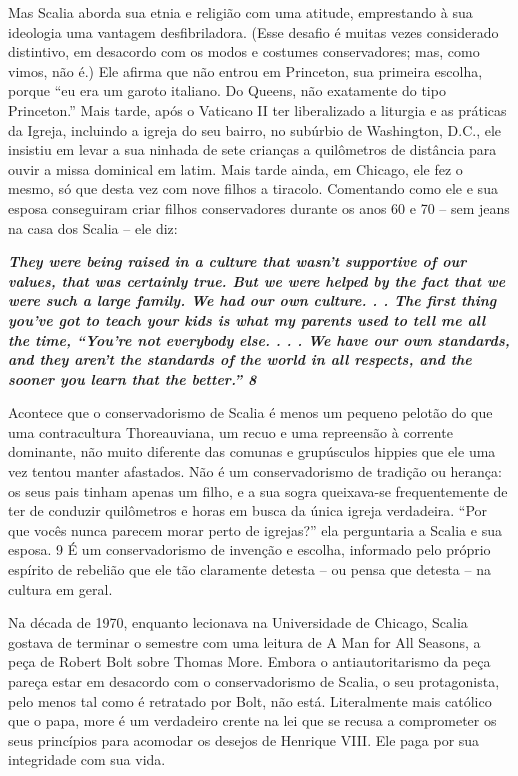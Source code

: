  
\par
 
Mas Scalia aborda sua etnia e religião com uma atitude, emprestando à sua ideologia uma vantagem desfibriladora. (Esse desafio é muitas vezes considerado distintivo, em desacordo com os modos e costumes conservadores; mas, como vimos, não é.) Ele afirma que não entrou em Princeton, sua primeira escolha, porque “eu era um garoto italiano. Do Queens, não exatamente do tipo Princeton.” Mais tarde, após o Vaticano II ter liberalizado a liturgia e as práticas da Igreja, incluindo a igreja do seu bairro, no subúrbio de Washington, D.C., ele insistiu em levar a sua ninhada de sete crianças a quilômetros de distância para ouvir a missa dominical em latim. Mais tarde ainda, em Chicago, ele fez o mesmo, só que desta vez com nove filhos a tiracolo. Comentando como ele e sua esposa conseguiram criar filhos conservadores durante os anos 60 e 70 – sem jeans na casa dos Scalia – ele diz:
 
\par
 

 \textbf{\textit{They were being raised in a culture that wasn’t supportive of our values, that was certainly true. But we were helped by the fact that we were such a large family. We had our own culture. . . The first thing you’ve got to teach your kids is what my parents used to tell me all the time, “You’re not everybody else. . . . We have our own standards, and they aren’t the standards of the world in all respects, and the sooner you learn that the better.” {{\color{blue} 8} } } }  
 
 
\par
 
Acontece que o conservadorismo de Scalia é menos um pequeno pelotão do que uma contracultura Thoreauviana, um recuo e uma repreensão à corrente dominante, não muito diferente das comunas e grupúsculos hippies que ele uma vez tentou manter afastados. Não é um conservadorismo de tradição ou herança: os seus pais tinham apenas um filho, e a sua sogra queixava-se frequentemente de ter de conduzir quilômetros e horas em busca da única igreja verdadeira. “Por que vocês nunca parecem morar perto de igrejas?” ela perguntaria a Scalia e sua esposa.
 {\color{blue} 9}  
É um conservadorismo de invenção e escolha, informado pelo próprio espírito de rebelião que ele tão claramente detesta – ou pensa que detesta – na cultura em geral.
 
\par
 
Na década de 1970, enquanto lecionava na Universidade de Chicago, Scalia gostava de terminar o semestre com uma leitura de A Man for All Seasons, a peça de Robert Bolt sobre Thomas More. Embora o antiautoritarismo da peça pareça estar em desacordo com o conservadorismo de Scalia, o seu protagonista, pelo menos tal como é retratado por Bolt, não está. Literalmente mais católico que o papa, more é um verdadeiro crente na lei que se recusa a comprometer os seus princípios para acomodar os desejos de Henrique VIII. Ele paga por sua integridade com sua vida.
 
